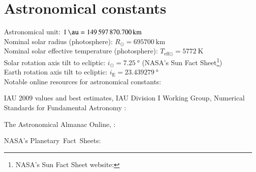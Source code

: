 \section{Astronomical constants}
\label{sec:astronomical_constants}

Astronomical unit: $\SI{1}{\au} = \SI{149597870.700}{\km}$ \citep{Luzum2011}\\
Nominal solar radius (photosphere): $R_\odot = \SI{695700}{\km}$ \citep{Mamajek2015}\\
Nominal solar effective temperature (photosphere): $T_{\text{eff}\odot} = \SI{5772}{\kelvin}$ \citep{Mamajek2015}\\
Solar rotation axis tilt to ecliptic: $i_\odot = \SI{7.25}{\degree}$ (NASA's Sun Fact Sheet\footnote{NASA's Sun Fact Sheet website: })\\ %
Earth rotation axis tilt to ecliptic: $i_\text{E} = \SI{23.439279}{\degree}$ \citep{Luzum2011}\\ %

\noindent Notable online resources for astronomical constants:
\begin{itemize*}
	\item IAU 2009 values and best estimates, IAU Division I Working Group, Numerical Standards for Fundamental Astronomy \citet{Luzum2011}:\\
	
	\item The Astronomical Almanac Online, \citet{USNAO2017}:\\
	
	\item NASA's Planetary~Fact~Sheets:\\
	
\end{itemize*}





